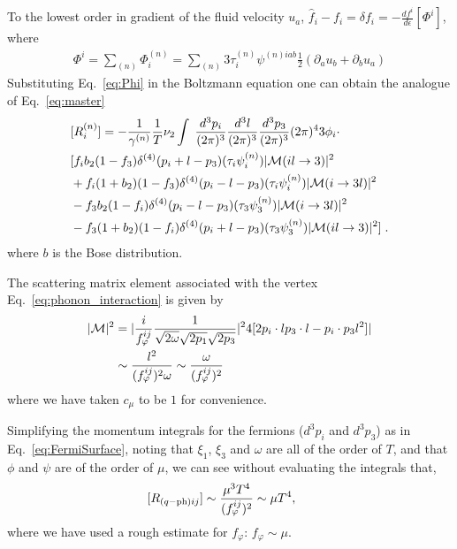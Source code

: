 \documentclass[10pt, aps, prd, superscriptaddress, nofootinbib, 
               amsmath, amssymb, twocolumn,
               preprintnumbers, showpacs,
               raggedbottom,
               floatfix]{revtex4-1}
\newcommand{\dthree}[1]{\frac{d^3#1}{(2\pi)^3}}
\newcommand{\calM}{{\cal{M}}}
\newcommand{\ph}{{\rm{ph}}}
\newcommand{\hatf}{{\hat{f}}}
\begin{document}
To the lowest order in gradient of the fluid velocity $u_a$, 
$\hatf_i-f_i=\delta f_i=-\frac{df^i}{d\epsilon}[\Phi^i]$, where 
\begin{equation}
\begin{split}
\Phi^i=\sum_{(n)}\Phi^{(n)}_i=\sum_{(n)}3\tau^{(n)}_i
\psi^{(n)i ab}\frac{1}{2}(\partial_au_b+\partial_b u_a)
\label{eq:Phi}
\end{split}
\end{equation}
Substituting Eq.~\ref{eq:Phi} in the Boltzmann equation one can obtain the analogue of
Eq.~\ref{eq:master}
\begin{equation}
\begin{split}
&[R^{(n)}_{i}]=-\frac{1}{\gamma^{(n)}}\frac{1}{T}\nu_2 \int\;
\dthree{p_i}\dthree{l}\dthree{p_3}(2\pi)^4 3\phi_i\cdot\\
&[
f_ib_2(1-f_3)\delta^{(4)}(p_i+l-p_3)(\tau_i\psi_i^{(n)})|\calM(il\rightarrow3)|^2\\
&
+f_i(1+b_2)(1-f_3)\delta^{(4)}(p_i-l-p_3)(\tau_i\psi_i^{(n)})|\calM(i\rightarrow3l)|^2\\
&
-f_3b_2(1-f_i)\delta^{(4)}(p_i-l-p_3)(\tau_3\psi_3^{(n)})|\calM(i\rightarrow3l)|^2\\
&
-f_3(1+b_2)(1-f_i)\delta^{(4)}(p_i+l-p_3)(\tau_3\psi_3^{(n)})|\calM(il\rightarrow3)|^2]\;.
\end{split}
\end{equation}
where $b$ is the Bose distribution.

The scattering matrix element associated with the vertex Eq.~\ref{eq:phonon_interaction}
is given by
\begin{equation}
\begin{split}
|{\cal{M}}|^2 &= |\frac{i}{f^{ij}_\varphi}
\frac{1}{\sqrt{2\omega}\sqrt{2p_1}\sqrt{2p_3}}|^2
4[2p_i\cdot l p_3\cdot l-p_i\cdot p_3 l^2]|\\
&\sim \frac{l^2}{(f^{ij}_\varphi)^2\omega}
\sim \frac{\omega}{(f^{ij}_{\varphi})^2}
\end{split}
\end{equation}
where we have taken $c_\mu$ to be $1$ for convenience.

Simplifying the momentum integrals for the fermions ($d^3p_i$ and $d^3p_3$) as
in Eq.~\ref{eq:FermiSurface}, noting that $\xi_1$, $\xi_3$ and $\omega$ are all
of the order of $T$, and that $\phi$ and $\psi$ are of the order of $\mu$,  we
can see without evaluating the integrals that,
\begin{equation}
\begin{split}
[R_{(q-\ph) ij}]&\sim \frac{\mu^3T^4}{(f_\varphi^{ij})^2} \sim  \mu T^4,
~\label{eq:Rqph}
\end{split}
\end{equation}
where we have used a rough estimate for $f_\varphi$: $f_\varphi\sim\mu$.
\end{document}
